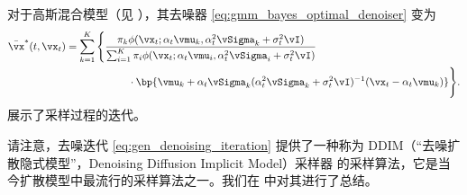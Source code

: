 \documentclass[../../book-main_zh.tex]{subfiles}
\begin{document}
\begin{example}
    对于高斯混合模型（见 ），其去噪器 \eqref{eq:gmm_bayes_optimal_denoiser} 变为
    \begin{align}\label{eq:gen_gmm_bayes_optimal_denoiser}
        \bar{\vx}^{\ast}(t, \vx_{t})
        &= \sum_{k = 1}^{K}\Bigg\{\frac{\pi_{k}\phi(\vx_{t}
                    ; \alpha_{t}\vmu_{k}, \alpha_{t}^{2}\vSigma_{k}
            + \sigma_{t}^{2}\vI)}{\sum_{i = 1}^{K}\pi_{i}\phi(\vx_{t} ;
                    \alpha_{t}\vmu_{i}, \alpha_{t}^{2}\vSigma_{i} +
            \sigma_{t}^{2}\vI)} \\
            &\qquad \qquad \qquad \cdot\bp{\vmu_{k} +
                \alpha_{t}\vSigma_{k}(\alpha_{t}^{2}\vSigma_{k} +
        \sigma_{t}^{2}\vI)^{-1}(\vx_{t} - \alpha_{t}\vmu_{k})}\Bigg\}. \nonumber
    \end{align}
     展示了采样过程的迭代。
\end{example}

请注意，去噪迭代 \eqref{eq:gen_denoising_iteration} 提供了一种称为 DDIM（“去噪扩散隐式模型”，Denoising Diffusion Implicit Model）采样器 \cite{song2020denoising} 的采样算法，它是当今扩散模型中最流行的采样算法之一。我们在  中对其进行了总结。

\begin{algorithm}
    \caption{使用去噪器进行采样。}
    \label{alg:iterative_denoising}
    \begin{algorithmic}[1]
         
        \EndFor
        \EndFunction
    \end{algorithmic}
\end{algorithm}
\end{document}

